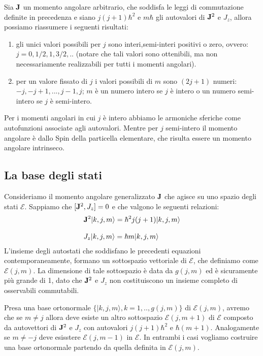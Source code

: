 \noindent Sia $\bold{J}$ un momento angolare arbitrario, che soddisfa le leggi di commutazione definite in precedenza e siano $j(j+1)\hbar^2$ e $m\hbar$ gli autovalori di $\bold{J}^2$ e $J_z$, allora possiamo riassumere i seguenti risultati:
\begin{enumerate}
	\item gli unici valori possibili per $j$ sono interi,semi-interi positivi o zero, ovvero: $j = 0,1/2,1,3/2,..$ (notare che tali valori sono ottenibili, ma non necessariamente realizzabili per tutti i momenti angolari).
	\item per un valore fissato di $j$ i valori possibili di $m$ sono $(2j+1)$ numeri: $-j,-j+1,...,j-1,j$; $m$ \`e un numero intero se $j$ \`e intero o un numero semi-intero se $j$ \`e semi-intero.
\end{enumerate} 
\newpage 
Per i momenti angolari in cui $j$ \`e intero abbiamo le armoniche sferiche come autofunzioni associate agli autovalori. Mentre per $j$ semi-intero il momento angolare \`e dallo Spin della particella elementare, che risulta essere un momento angolare intrinseco. 

\subsection{La base degli stati}

Consideriamo il momento angolare generalizzato $\bold{J}$ che agisce su uno spazio degli stati $\mathcal{E}$. Sappiamo che $[\bold{J}^2,J_z] = 0$ e che valgono le seguenti relazioni:
\begin{align*}
	& \bold{J}^2|k,j,m \rangle = \hbar^2j(j+1)|k,j,m \rangle \\[0.3cm]
	& J_z | k,j,m \rangle = \hbar m|k,j,m \rangle 
\end{align*}
L'insieme degli autostati che soddisfano le precedenti equazioni contemporaneamente, formano un sottospazio vettoriale di $\mathcal{E}$, che definiamo come $\mathcal{E}(j,m)$. La dimensione di tale sottospazio \`e data da $g(j,m)$ ed \`e sicuramente pi\`u grande di 1, dato che $\bold{J}^2$ e $J_z$ non costituiscono un insieme completo di osservabili commutabili.

Presa una base ortonormale $\{|k,j,m \rangle , k = 1,..,g(j,m) \}$ di $\mathcal{E}(j,m)$, avremo che se $m \neq j$  allora deve esiste un altro sottospazio $\mathcal{E}(j,m+1)$ di $\mathcal{E}$ composto da autovettori di $\bold{J}^2$ e $J_z$ con autovalori $j(j+1)\hbar^2$ e $\hbar(m+1)$. Analogamente se $m \neq -j$ deve esisstere $\mathcal{E}(j,m-1)$ in $\mathcal{E}$. In entrambi i casi vogliamo costruire una base ortonormale partendo da quella definita in $\mathcal{E}(j,m)$.
\newline

